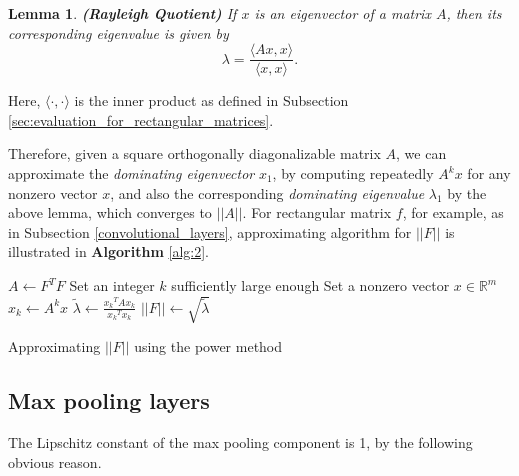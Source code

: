 \documentclass[11pt]{report}
\newtheorem{lemma}{Lemma} %
\begin{document}
\begin{lemma}\label{lemm:Rayleigh}
\textbf{(Rayleigh Quotient)}
If \(x\) is an eigenvector of a matrix \(A\), then its corresponding eigenvalue is given by
\[\lambda = \frac{\langle Ax,x\rangle}{\langle x,x\rangle}.\]
\end{lemma}
Here, \(\langle\cdot,\cdot\rangle\) is the inner product as defined in Subsection \ref{sec:evaluation_for_rectangular_matrices}.

Therefore, given a square orthogonally diagonalizable matrix $A$, we can approximate the \emph{dominating eigenvector} $x_1$, by computing repeatedly $A^kx$ for any nonzero vector $x$, and also the corresponding \emph{dominating eigenvalue} $\lambda_1$ by the above lemma, which converges to $||A||$.
For rectangular matrix \(f\), for example, as in Subsection \ref{convolutional_layers}, approximating algorithm for \(||F||\) is illustrated in \textbf{Algorithm} \ref{alg:2}.



\begin{algorithm}
\BlankLine
\(A\gets F^TF\)\;
Set an integer \(k\) sufficiently large enough\;
Set a nonzero vector \(x\in\mathbb R^m\)\;
\(x_k\gets A^kx\)\;
\(\tilde\lambda\gets\frac{{x_k}^TAx_k}{{x_k}^Tx_k}\)\;
\(||F||\gets\sqrt{\tilde\lambda}\)
\caption{Approximating \(||F||\) using the power method}
\label{alg:2}
\end{algorithm}

\subsection{Max pooling layers}

The Lipschitz constant of the max pooling component is 1, by the following obvious reason.
\end{document}
